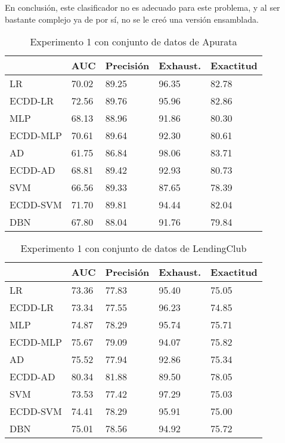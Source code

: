 En conclusión, este clasificador no es adecuado para este problema, y al ser bastante complejo ya de por sí, no se le creó una versión ensamblada.


\begin{table}[]
\centering
\caption{Experimento 1 con conjunto de datos de Apurata}
\label{tab:apurata-proc1}
\begin{tabularx}{0.75\textwidth}{|l|Y Y Y Y|}
				\hline
				& AUC		& Precisión	& Exhaust.		& Exactitud	\\
				\hline
LR				& 70.02		& 89.25		& 96.35			& 82.78		\\
ECDD-LR			& 72.56		& 89.76		& 95.96			& 82.86		\\
				\hline
MLP				& 68.13		& 88.96		& 91.86			& 80.30		\\
ECDD-MLP		& 70.61		& 89.64		& 92.30			& 80.61		\\
				\hline
AD				& 61.75		& 86.84		& 98.06			& 83.71		\\
ECDD-AD			& 68.81		& 89.42		& 92.93			& 80.73		\\
				\hline
SVM				& 66.56		& 89.33		& 87.65			& 78.39		\\
ECDD-SVM		& 71.70		& 89.81		& 94.44			& 82.04		\\
				\hline
DBN				& 67.80		& 88.04		& 91.76			& 79.84		\\
				\hline
\end{tabularx}
\end{table}


\begin{table}[]
\centering
\caption{Experimento 1 con conjunto de datos de LendingClub}
\label{tab:lc-proc1}
\begin{tabularx}{0.75\textwidth}{|l|Y Y Y Y|}
				\hline
				& AUC		& Precisión	& Exhaust.		& Exactitud	\\
				\hline
LR				& 73.36		& 77.83		& 95.40			& 75.05		\\
ECDD-LR			& 73.34		& 77.55		& 96.23			& 74.85		\\
				\hline
MLP				& 74.87		& 78.29		& 95.74			& 75.71		\\
ECDD-MLP		& 75.67		& 79.09		& 94.07			& 75.82		\\
				\hline
AD				& 75.52		& 77.94		& 92.86			& 75.34		\\
ECDD-AD			& 80.34		& 81.88		& 89.50			& 78.05		\\
				\hline
SVM				& 73.53		& 77.42		& 97.29			& 75.03		\\
ECDD-SVM		& 74.41		& 78.29		& 95.91			& 75.00		\\
				\hline
DBN				& 75.01		& 78.56		& 94.92			& 75.72		\\
				\hline
\end{tabularx}
\end{table}


